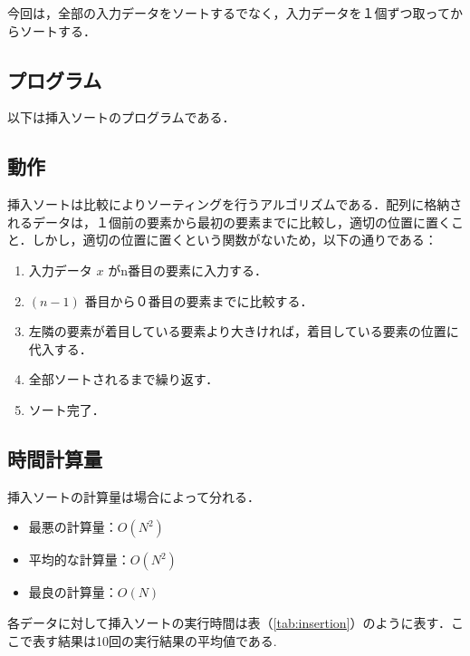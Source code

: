 \documentclass[a4j, titlepage]{jarticle}
\begin{document}
        今回は，全部の入力データをソートするでなく，入力データを１個ずつ取ってからソートする．
    
        \subsection{プログラム}
            以下は挿入ソートのプログラムである．
            

        \subsection{動作}
            挿入ソートは比較によりソーティングを行うアルゴリズムである．配列に格納されるデータは，１個前の要素から最初の要素までに比較し，適切の位置に置くこと．しかし，適切の位置に置くという関数がないため，以下の通りである：
            
            \begin{screen}
                \begin{enumerate}
                    \item 入力データ $x$ がn番目の要素に入力する．
                    \item $(n-1)$ 番目から０番目の要素までに比較する．
                    \item 左隣の要素が着目している要素より大きければ，着目している要素の位置に代入する．
                    \item 全部ソートされるまで繰り返す．
                    \item ソート完了．
                \end{enumerate}
            \end{screen}
            
        
        \subsection{時間計算量}
            挿入ソートの計算量は場合によって分れる．
            \begin{itemize}
                \item 最悪の計算量：$O(N^2)$
                \item 平均的な計算量：$O(N^2)$
                \item 最良の計算量：$O(N)$
            \end{itemize}

            各データに対して挿入ソートの実行時間は表（\ref{tab:insertion}）のように表す．ここで表す結果は10回の実行結果の平均値である.
\end{document}
